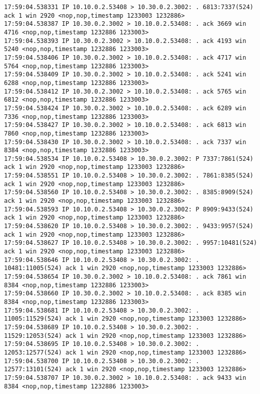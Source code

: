 \documentclass[a4paper,12pt]{article}
\begin{document}
\begin{Verbatim}
17:59:04.538331 IP 10.10.0.2.53408 > 10.30.0.2.3002: . 6813:7337(524) ack 1 win 2920 <nop,nop,timestamp 1233003 1232886>
17:59:04.538387 IP 10.30.0.2.3002 > 10.10.0.2.53408: . ack 3669 win 4716 <nop,nop,timestamp 1232886 1233003>
17:59:04.538393 IP 10.30.0.2.3002 > 10.10.0.2.53408: . ack 4193 win 5240 <nop,nop,timestamp 1232886 1233003>
17:59:04.538406 IP 10.30.0.2.3002 > 10.10.0.2.53408: . ack 4717 win 5764 <nop,nop,timestamp 1232886 1233003>
17:59:04.538409 IP 10.30.0.2.3002 > 10.10.0.2.53408: . ack 5241 win 6288 <nop,nop,timestamp 1232886 1233003>
17:59:04.538412 IP 10.30.0.2.3002 > 10.10.0.2.53408: . ack 5765 win 6812 <nop,nop,timestamp 1232886 1233003>
17:59:04.538424 IP 10.30.0.2.3002 > 10.10.0.2.53408: . ack 6289 win 7336 <nop,nop,timestamp 1232886 1233003>
17:59:04.538427 IP 10.30.0.2.3002 > 10.10.0.2.53408: . ack 6813 win 7860 <nop,nop,timestamp 1232886 1233003>
17:59:04.538430 IP 10.30.0.2.3002 > 10.10.0.2.53408: . ack 7337 win 8384 <nop,nop,timestamp 1232886 1233003>
17:59:04.538534 IP 10.10.0.2.53408 > 10.30.0.2.3002: P 7337:7861(524) ack 1 win 2920 <nop,nop,timestamp 1233003 1232886>
17:59:04.538551 IP 10.10.0.2.53408 > 10.30.0.2.3002: . 7861:8385(524) ack 1 win 2920 <nop,nop,timestamp 1233003 1232886>
17:59:04.538560 IP 10.10.0.2.53408 > 10.30.0.2.3002: . 8385:8909(524) ack 1 win 2920 <nop,nop,timestamp 1233003 1232886>
17:59:04.538593 IP 10.10.0.2.53408 > 10.30.0.2.3002: P 8909:9433(524) ack 1 win 2920 <nop,nop,timestamp 1233003 1232886>
17:59:04.538620 IP 10.10.0.2.53408 > 10.30.0.2.3002: . 9433:9957(524) ack 1 win 2920 <nop,nop,timestamp 1233003 1232886>
17:59:04.538627 IP 10.10.0.2.53408 > 10.30.0.2.3002: . 9957:10481(524) ack 1 win 2920 <nop,nop,timestamp 1233003 1232886>
17:59:04.538646 IP 10.10.0.2.53408 > 10.30.0.2.3002: . 10481:11005(524) ack 1 win 2920 <nop,nop,timestamp 1233003 1232886>
17:59:04.538654 IP 10.30.0.2.3002 > 10.10.0.2.53408: . ack 7861 win 8384 <nop,nop,timestamp 1232886 1233003>
17:59:04.538660 IP 10.30.0.2.3002 > 10.10.0.2.53408: . ack 8385 win 8384 <nop,nop,timestamp 1232886 1233003>
17:59:04.538681 IP 10.10.0.2.53408 > 10.30.0.2.3002: . 11005:11529(524) ack 1 win 2920 <nop,nop,timestamp 1233003 1232886>
17:59:04.538689 IP 10.10.0.2.53408 > 10.30.0.2.3002: . 11529:12053(524) ack 1 win 2920 <nop,nop,timestamp 1233003 1232886>
17:59:04.538695 IP 10.10.0.2.53408 > 10.30.0.2.3002: . 12053:12577(524) ack 1 win 2920 <nop,nop,timestamp 1233003 1232886>
17:59:04.538700 IP 10.10.0.2.53408 > 10.30.0.2.3002: . 12577:13101(524) ack 1 win 2920 <nop,nop,timestamp 1233003 1232886>
17:59:04.538707 IP 10.30.0.2.3002 > 10.10.0.2.53408: . ack 9433 win 8384 <nop,nop,timestamp 1232886 1233003>

\end{Verbatim}
\end{document}
